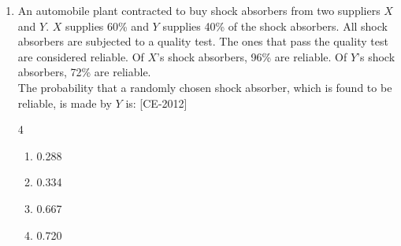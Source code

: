 \documentclass[journal]{IEEEtran}
\begin{document}
\begin{enumerate}
    \item An automobile plant contracted to buy shock absorbers from two suppliers $X$ and $Y$. $X$ supplies 60\% and $Y$ supplies 40\% of the shock absorbers. All shock absorbers are subjected to a quality test. The ones that pass the quality test are considered reliable. Of $X$'s shock absorbers, 96\% are reliable. Of $Y$'s shock absorbers, 72\% are reliable.\\

     The probability that a randomly chosen shock absorber, which is found to be reliable, is made by $Y$ is: \hfill{[CE-2012]}
\begin{multicols}{4}
    

    \begin{enumerate}
        \item 0.288
        \item 0.334
        \item 0.667
        \item 0.720
    \end{enumerate}
    \end{multicols}

     
    
\end{enumerate}
\end{document}
